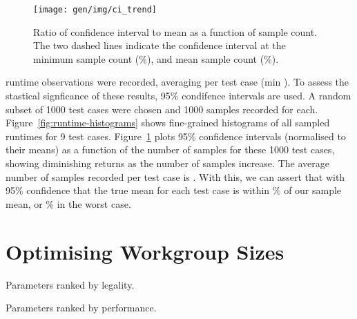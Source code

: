 \begin{figure}
\centering
\texttt{[image: gen/img/ci\_trend]}
\caption{%
  Ratio of confidence interval to mean as a function of sample
  count. The two dashed lines indicate the confidence interval at the
  minimum sample count (\%), and mean sample count
  (\%).%
}
\label{fig:ci-trends}
\end{figure}


 runtime observations were recorded, averaging
 per test case (min
). To assess the stastical signficance of
these results, 95\% condifence intervals are used. A random subset of
1000 test cases were chosen and 1000 samples recorded for
each. Figure~\ref{fig:runtime-histograms} shows fine-grained
histograms of all sampled runtimes for 9 test
cases. Figure~\ref{fig:ci-trends} plots 95\% confidence intervals
(normalised to their means) as a function of the number of samples for
these 1000 test cases, showing diminishing returns as the number of
samples increase. The average number of samples recorded per test case
is . With this, we can assert that with
95\% confidence that the true mean for each test case is within
\% of our sample mean, or \% in
the worst case.





\section{Optimising Workgroup Sizes}

%


\begin{table}
  \parbox{.45\linewidth}{
    \centering
    \scriptsize
    
    \caption{Parameters ranked by legality.}
  }
  \hfill
  \parbox{.45\linewidth}{
    \centering
    \scriptsize
    
    \caption{Parameters ranked by performance.}
  }
\end{table}


